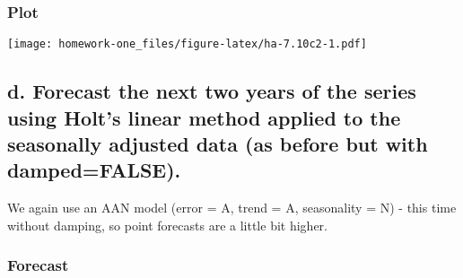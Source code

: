 \documentclass[openany]{book}
\newenvironment{Shaded}{\begin{snugshade}}{\end{snugshade}}
\newcommand{\DataTypeTok}[1]{\textcolor[rgb]{0.13,0.29,0.53}{#1}}
\newcommand{\FloatTok}[1]{\textcolor[rgb]{0.00,0.00,0.81}{#1}}
\newcommand{\KeywordTok}[1]{\textcolor[rgb]{0.13,0.29,0.53}{\textbf{#1}}}
\newcommand{\NormalTok}[1]{#1}
\newcommand{\OperatorTok}[1]{\textcolor[rgb]{0.81,0.36,0.00}{\textbf{#1}}}
\newcommand{\StringTok}[1]{\textcolor[rgb]{0.31,0.60,0.02}{#1}}
\begin{document}
\hypertarget{plot-1}{%
\subsubsection{Plot}\label{plot-1}}

\begin{Shaded}
\end{Shaded}

\texttt{[image: homework-one\_files/figure-latex/ha-7.10c2-1.pdf]}

\hypertarget{d.-forecast-the-next-two-years-of-the-series-using-holts-linear-method-applied-to-the-seasonally-adjusted-data-as-before-but-with-dampedfalse.}{%
\subsection{d. Forecast the next two years of the series using Holt's linear method applied to the seasonally adjusted data (as before but with damped=FALSE).}\label{d.-forecast-the-next-two-years-of-the-series-using-holts-linear-method-applied-to-the-seasonally-adjusted-data-as-before-but-with-dampedfalse.}}

We again use an AAN model (error = A, trend = A, seasonality = N) - this time without damping, so point forecasts are a little bit higher.

\hypertarget{forecast-1}{%
\subsubsection{Forecast}\label{forecast-1}}
\end{document}
